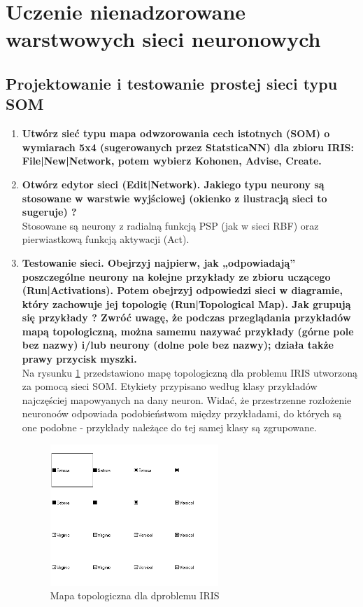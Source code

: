 
\section{Uczenie nienadzorowane warstwowych sieci neuronowych}

\subsection{Projektowanie i testowanie prostej sieci typu SOM}

\begin{enumerate}
\item \textbf{Utwórz sieć typu mapa odwzorowania cech istotnych (SOM) o wymiarach 5x4 (sugerowanych przez StatsticaNN) dla zbioru IRIS: File|New|Network, potem wybierz Kohonen, Advise, Create.}

\item \textbf{
Otwórz edytor sieci (Edit|Network). Jakiego typu neurony są stosowane w warstwie wyjściowej (okienko z ilustracją sieci to sugeruje) ?}
\\Stosowane są neurony z radialną funkcją PSP (jak w sieci RBF) oraz pierwiastkową funkcją aktywacji (Act).


\item \textbf{
Testowanie sieci. Obejrzyj najpierw, jak „odpowiadają” poszczególne neurony na kolejne przykłady ze zbioru uczącego (Run|Activations). Potem obejrzyj odpowiedzi sieci w diagramie, który zachowuje jej topologię (Run|Topological Map).  Jak grupują się przykłady ?
Zwróć uwagę, że podczas przeglądania przykładów mapą topologiczną, można samemu nazywać przykłady (górne pole bez nazwy) i/lub neurony (dolne pole bez nazwy); działa także prawy przycisk myszki.}
\\Na rysunku \ref{fig:map-iris} przedstawiono mapę topologiczną dla problemu IRIS utworzoną za pomocą sieci SOM. Etykiety przypisano według klasy przykładów najczęściej mapowyanych na dany neuron. Widać, że przestrzenne rozłożenie neuronoów odpowiada podobieństwom między przykładami, do których są one podobne - przykłady należące do tej samej klasy są zgrupowane.

\begin{figure}[h]
\begin{centering}
\includegraphics[width=0.6\textwidth]{dane/part3/zad1/map-iris}
\caption{Mapa topologiczna dla dproblemu IRIS\label{fig:map-iris}}
\end{centering}
\end{figure}


\end{enumerate}
